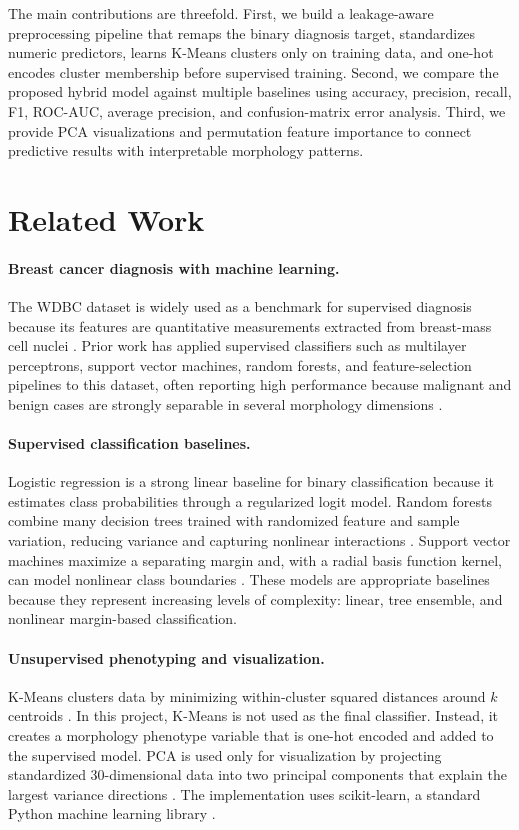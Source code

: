 \documentclass{article}
\begin{document}
The main contributions are threefold. First, we build a leakage-aware preprocessing pipeline that remaps the binary
diagnosis target, standardizes numeric predictors, learns K-Means clusters only on training data, and one-hot encodes cluster
membership before supervised training. Second, we compare the proposed hybrid model against multiple baselines using
accuracy, precision, recall, F1, ROC-AUC, average precision, and confusion-matrix error analysis. Third, we provide PCA
visualizations and permutation feature importance to connect predictive results with interpretable morphology patterns.

\section{Related Work}

\paragraph{Breast cancer diagnosis with machine learning.} The WDBC dataset is widely used as a benchmark for supervised
diagnosis because its features are quantitative measurements extracted from breast-mass cell nuclei \cite{uci_wdbc}. Prior work has
applied supervised classifiers such as multilayer perceptrons, support vector machines, random forests, and feature-selection
pipelines to this dataset, often reporting high performance because malignant and benign cases are strongly separable in
several morphology dimensions \cite{aamir2022predicting}.

\paragraph{Supervised classification baselines.} Logistic regression is a strong linear baseline for binary classification because it
estimates class probabilities through a regularized logit model. Random forests combine many decision trees trained with
randomized feature and sample variation, reducing variance and capturing nonlinear interactions \cite{breiman2001random}. Support vector machines
maximize a separating margin and, with a radial basis function kernel, can model nonlinear class boundaries \cite{cortes1995support}. These
models are appropriate baselines because they represent increasing levels of complexity: linear, tree ensemble, and nonlinear
margin-based classification.

\paragraph{Unsupervised phenotyping and visualization.} K-Means clusters data by minimizing within-cluster squared distances
around $k$ centroids \cite{macqueen1967kmeans}. In this project, K-Means is not used as the final classifier. Instead, it creates a morphology phenotype
variable that is one-hot encoded and added to the supervised model. PCA is used only for visualization by projecting
standardized 30-dimensional data into two principal components that explain the largest variance directions \cite{hotelling1933analysis}. The
implementation uses scikit-learn, a standard Python machine learning library \cite{pedregosa2011scikit}.
\end{document}
